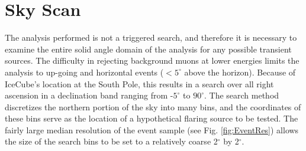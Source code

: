 \documentclass{gatech-thesis}
\begin{document}
\section{Sky Scan}

The analysis performed is not a triggered search, and therefore it is necessary to examine the entire solid angle domain of the analysis for any possible transient sources. The difficulty in rejecting background muons at lower energies limits the analysis to up-going and horizontal events ($< 5^{\circ}$ above the horizon). Because of IceCube's location at the South Pole, this results in a search over all right ascension in a declination band ranging from -$5^{\circ}$ to $90^{\circ}$. The search method discretizes the northern portion of the sky into many bins, and the coordinates of these bins serve as the location of a hypothetical flaring source to be tested. The fairly large median resolution of the event sample (see Fig. \ref{fig:EventRes}) allows the size of the search bins to be set to a relatively coarse 2$^{\circ}$ by 2$^{\circ}$. 
\end{document}
